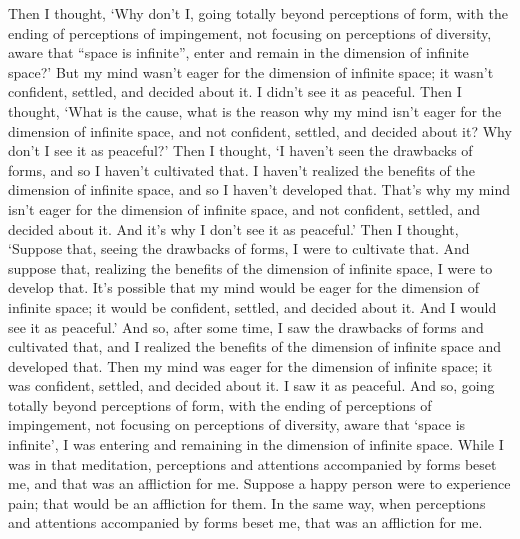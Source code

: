 \documentclass[12pt,openany]{book}%
\begin{document}
Then I thought, ‘Why don’t I, going totally beyond perceptions of form, with the ending of perceptions of impingement, not focusing on perceptions of diversity, aware that “space is infinite”, enter and remain in the dimension of infinite space?’ But my mind wasn’t eager for the dimension of infinite space; it wasn’t confident, settled, and decided about it. I didn’t see it as peaceful. Then I thought, ‘What is the cause, what is the reason why my mind isn’t eager for the dimension of infinite space, and not confident, settled, and decided about it? Why don’t I see it as peaceful?’ Then I thought, ‘I haven’t seen the drawbacks of forms, and so I haven’t cultivated that. I haven’t realized the benefits of the dimension of infinite space, and so I haven’t developed that. That’s why my mind isn’t eager for the dimension of infinite space, and not confident, settled, and decided about it. And it’s why I don’t see it as peaceful.’ Then I thought, ‘Suppose that, seeing the drawbacks of forms, I were to cultivate that. And suppose that, realizing the benefits of the dimension of infinite space, I were to develop that. It’s possible that my mind would be eager for the dimension of infinite space; it would be confident, settled, and decided about it. And I would see it as peaceful.’ And so, after some time, I saw the drawbacks of forms and cultivated that, and I realized the benefits of the dimension of infinite space and developed that. Then my mind was eager for the dimension of infinite space; it was confident, settled, and decided about it. I saw it as peaceful. And so, going totally beyond perceptions of form, with the ending of perceptions of impingement, not focusing on perceptions of diversity, aware that ‘space is infinite’, I was entering and remaining in the dimension of infinite space. While I was in that meditation, perceptions and attentions accompanied by forms beset me, and that was an affliction for me. Suppose a happy person were to experience pain; that would be an affliction for them. In the same way, when perceptions and attentions accompanied by forms beset me, that was an affliction for me. 
\end{document}
